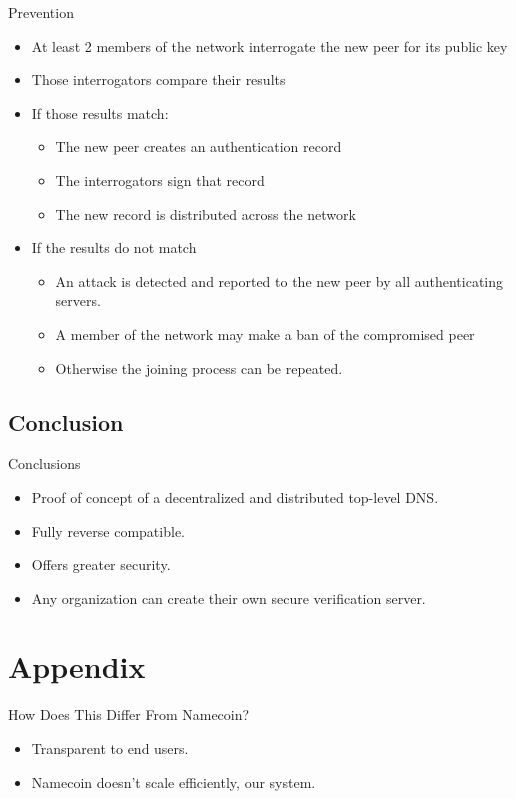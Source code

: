\documentclass[11pt]{beamer}
\begin{document}
\begin{frame}{Prevention}

	\begin{itemize}
		\item  At least 2 members of the network interrogate the new peer for its public key
		\item  Those interrogators compare their results
		\item  If those results match:
		\begin{itemize}
		
		    \item The new peer creates an authentication record
		    \item The interrogators sign that record
		    \item The new record is distributed across the network
		\end{itemize}
		
		
		\item  If the results do not match
		\begin{itemize}
		
		    \item An attack is detected and reported to the new peer by all authenticating servers.
		    \item A member of the network may make a ban of the compromised peer
		    \item Otherwise the joining process can be repeated.
		\end{itemize}
		
	\end{itemize}


\end{frame}


\subsection{Conclusion}
\begin{frame}{Conclusions}
	\begin{itemize}
		\item Proof of concept of a decentralized and distributed top-level DNS.
		\item Fully reverse compatible.
		\item Offers greater security.
		\item Any organization can create their own secure verification server.
		
	\end{itemize}
\end{frame}



\section*{Appendix}
\begin{frame}{How Does This Differ From Namecoin?}
	\begin{itemize}
		\item Transparent to end users.
		\item Namecoin doesn't scale efficiently, our system.
	\end{itemize}
\end{frame}
\end{document}
